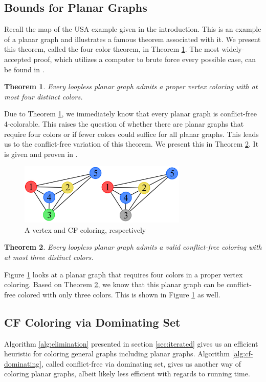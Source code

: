\documentclass{sig-alternate}
\newtheorem{theorem}{Theorem}
\begin{document}
\subsection{Bounds for Planar Graphs}
\label{sec:bounds}
Recall the map of the USA example given in the introduction. This is an example of a planar graph and illustrates a famous theorem associated with it. We present this theorem, called the four color theorem, in Theorem \ref{thm:four}. The most widely-accepted proof, which utilizes a computer to brute force every possible case, can be found in \cite{robertson1997four}.

\begin{theorem} \label{thm:four}
Every loopless planar graph admits a proper vertex coloring with at most four distinct colors.
\end{theorem}

Due to Theorem \ref{thm:four}, we immediately know that every planar graph is conflict-free 4-colorable. This raises the question of whether there are planar graphs that require four colors or if fewer colors could suffice for all planar graphs. This leads us to the conflict-free variation of this theorem. We present this in Theorem \ref{thm:four-cf}. It is given and proven in \cite{abel2017three}.

\begin{figure}[h]
	\centering
	\includegraphics[width=8cm,trim=4 4 4 4,clip]{../figures/four.pdf}
	\caption{A vertex and CF coloring, respectively}\label{fig:four}
\end{figure}

\begin{theorem} \label{thm:four-cf}
Every loopless planar graph admits a valid conflict-free coloring with at most three distinct colors.
\end{theorem}

Figure \ref{fig:four} looks at a planar graph that requires four colors in a proper vertex coloring. Based on Theorem \ref{thm:four-cf}, we know that this planar graph can be conflict-free colored with only three colors. This is shown in Figure \ref{fig:four} as well.

\subsection{CF Coloring via Dominating Set}
\label{sec:coloring-dom}
Algorithm \ref{alg:elimination} presented in section \ref{sec:iterated} gives us an efficient heuristic for coloring general graphs including planar graphs. Algorithm \ref{alg:cf-dominating}, called conflict-free via dominating set, gives us another way of coloring planar graphs, albeit likely less efficient with regards to running time.
\end{document}

